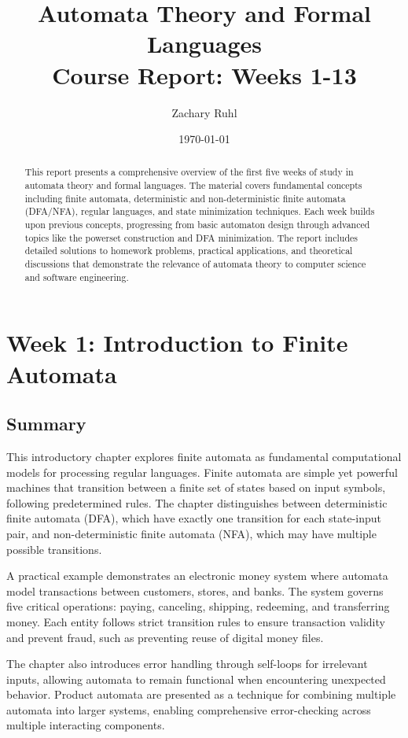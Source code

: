 \documentclass{article}
\title{Automata Theory and Formal Languages\\
\Large Course Report: Weeks 1-13}
\author{Zachary Ruhl}
\date{\today}
\begin{document}
\maketitle

\begin{abstract}
This report presents a comprehensive overview of the first five weeks of study in automata theory and formal languages. The material covers fundamental concepts including finite automata, deterministic and non-deterministic finite automata (DFA/NFA), regular languages, and state minimization techniques. Each week builds upon previous concepts, progressing from basic automaton design through advanced topics like the powerset construction and DFA minimization. The report includes detailed solutions to homework problems, practical applications, and theoretical discussions that demonstrate the relevance of automata theory to computer science and software engineering.
\end{abstract}

\tableofcontents
\newpage

\section{Week 1: Introduction to Finite Automata}

\subsection{Summary}
This introductory chapter explores finite automata as fundamental computational models for processing regular languages. Finite automata are simple yet powerful machines that transition between a finite set of states based on input symbols, following predetermined rules. The chapter distinguishes between deterministic finite automata (DFA), which have exactly one transition for each state-input pair, and non-deterministic finite automata (NFA), which may have multiple possible transitions.

A practical example demonstrates an electronic money system where automata model transactions between customers, stores, and banks. The system governs five critical operations: paying, canceling, shipping, redeeming, and transferring money. Each entity follows strict transition rules to ensure transaction validity and prevent fraud, such as preventing reuse of digital money files.

The chapter also introduces error handling through self-loops for irrelevant inputs, allowing automata to remain functional when encountering unexpected behavior. Product automata are presented as a technique for combining multiple automata into larger systems, enabling comprehensive error-checking across multiple interacting components.
\end{document}
